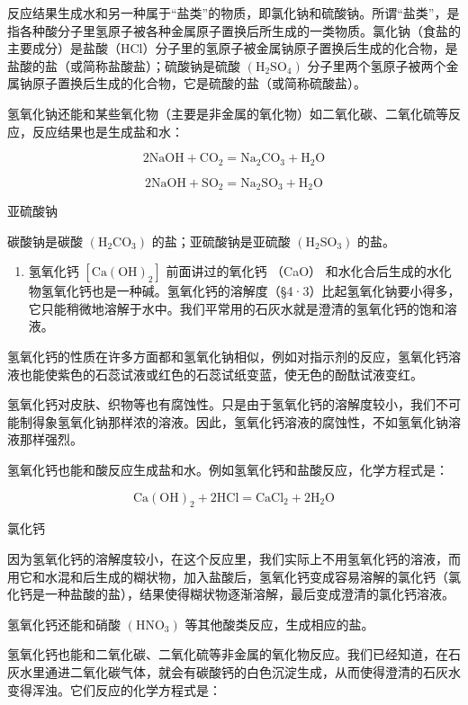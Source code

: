 反应结果生成水和另一种属于``盐类''的物质，即氯化钠和硫酸钠。所谓``盐类''，是指各种酸分子里氢原子被各种金属原子置换后所生成的一类物质。氯化钠（食盐的主要成分）是盐酸（HCl）分子里的氢原子被金属钠原子置换后生成的化合物，是盐酸的盐（或简称盐酸盐）；硫酸钠是硫酸
\(\left(\mathrm{H}_{2}\mathrm{SO}_{4}\right)\)
分子里两个氢原子被两个金属钠原子置换后生成的化合物，它是硫酸的盐（或简称硫酸盐）。

氢氧化钠还能和某些氧化物（主要是非金属的氧化物）如二氧化碳、二氧化硫等反应，反应结果也是生成盐和水：

\[
2 \mathrm{NaOH} + \mathrm{CO}_{2} = \mathrm{Na}_{2} \mathrm{CO}_{3} + \mathrm{H}_{2} \mathrm{O}
\]

\[
2 \mathrm{NaOH} + \mathrm{SO}_{2} = \mathrm{Na}_{2} \mathrm{SO}_{3} + \mathrm{H}_{2} \mathrm{O}
\]

亚硫酸钠

碳酸钠是碳酸 \(\left(\mathrm{H}_{2}\mathrm{CO}_{3}\right)\)
的盐；亚硫酸钠是亚硫酸 \(\left(\mathrm{H}_{2}\mathrm{SO}_{3}\right)\)
的盐。

\begin{enumerate}[start=2]
\item
  氢氧化钙 \(\left[\mathrm{Ca(OH)}_{2}\right]\) 前面讲过的氧化钙 （CaO）
  和水化合后生成的水化物氢氧化钙也是一种碱。氢氧化钙的溶解度（§4·3）比起氢氧化钠要小得多，它只能稍微地溶解于水中。我们平常用的石灰水就是澄清的氢氧化钙的饱和溶液。
\end{enumerate}

氢氧化钙的性质在许多方面都和氢氧化钠相似，例如对指示剂的反应，氢氧化钙溶液也能使紫色的石蕊试液或红色的石蕊试纸变蓝，使无色的酚酞试液变红。

氢氧化钙对皮肤、织物等也有腐蚀性。只是由于氢氧化钙的溶解度较小，我们不可能制得象氢氧化钠那样浓的溶液。因此，氢氧化钙溶液的腐蚀性，不如氢氧化钠溶液那样强烈。

氢氧化钙也能和酸反应生成盐和水。例如氢氧化钙和盐酸反应，化学方程式是：

\[
\mathrm{Ca(OH)}_{2} + 2 \mathrm{HCl} = \mathrm{CaCl}_{2} + 2 \mathrm{H}_{2} \mathrm{O}
\]

氯化钙

因为氢氧化钙的溶解度较小，在这个反应里，我们实际上不用氢氧化钙的溶液，而用它和水混和后生成的糊状物，加入盐酸后，氢氧化钙变成容易溶解的氯化钙（氯化钙是一种盐酸的盐），结果使得糊状物逐渐溶解，最后变成澄清的氯化钙溶液。

氢氧化钙还能和硝酸 \(\left(\mathrm{HNO}_{3}\right)\)
等其他酸类反应，生成相应的盐。

氢氧化钙也能和二氧化碳、二氧化硫等非金属的氧化物反应。我们已经知道，在石灰水里通进二氧化碳气体，就会有碳酸钙的白色沉淀生成，从而使得澄清的石灰水变得浑浊。它们反应的化学方程式是：

